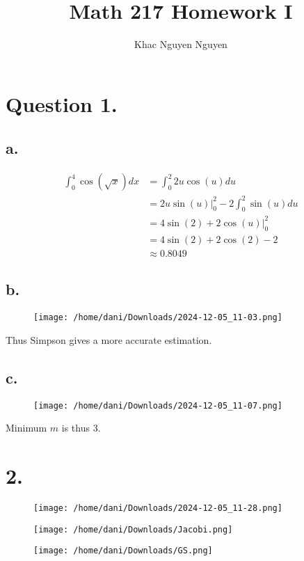 \documentclass[11pt]{article}
\title{\textbf{Math 217 Homework I}}
\author{Khac Nguyen Nguyen}
\date{}
\theoremstyle{mystyle}
\theoremstyle{definition}
\begin{document}
\section*{Question 1.}
\subsection*{a.}
\begin{align*}
  \int_0^4 \cos(\sqrt{x}) dx &= \int_0^2 2u\cos(u) du \\
  &= 2u \sin(u) |_0^2 - 2\int_0^2 \sin(u) du \\
  &= 4 \sin(2) + 2\cos(u) |_0^2 \\
  &= 4 \sin(2) + 2\cos(2) -2 \\ 
  &\approx 0.8049
\end{align*}
\subsection*{b.}
\begin{figure}[h]
  \centering
  \texttt{[image: /home/dani/Downloads/2024-12-05\_11-03.png]}
  \caption{}
  \label{fig:2024-12-05_11-03}
\end{figure}
Thus Simpson gives a more accurate estimation.
\subsection*{c.}
\begin{figure}[h]
  \centering
  \texttt{[image: /home/dani/Downloads/2024-12-05\_11-07.png]}
  \caption{}
  \label{fig:2024-12-05_11-07}
\end{figure}
Minimum $m$ is thus 3.
\clearpage 
\section*{2.}

\begin{figure}[h]
  \centering
  \texttt{[image: /home/dani/Downloads/2024-12-05\_11-28.png]}
  \caption{}
  \label{fig:2024-12-05_11-28}
\end{figure}

\begin{figure}[h]
  \centering
  \texttt{[image: /home/dani/Downloads/Jacobi.png]}
  \caption{}
  \label{fig:jacobi}
\end{figure}

\begin{figure}[h]
  \centering
  \texttt{[image: /home/dani/Downloads/GS.png]}
  \caption{}
  \label{fig:gs}
\end{figure}
\end{document}
